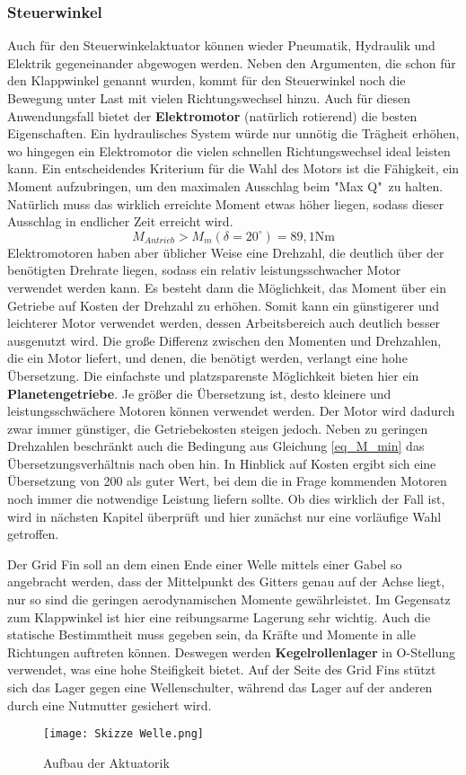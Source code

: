 \subsubsection{Steuerwinkel}
Auch für den Steuerwinkelaktuator können wieder Pneumatik, Hydraulik und Elektrik gegeneinander abgewogen werden. Neben den Argumenten, die schon für den Klappwinkel genannt wurden, kommt für den Steuerwinkel noch die Bewegung unter Last mit vielen Richtungswechsel hinzu. Auch für diesen Anwendungsfall bietet der \textbf{Elektromotor} (natürlich rotierend) die besten Eigenschaften. Ein hydraulisches System würde nur unnötig die Trägheit erhöhen, wo hingegen ein Elektromotor die vielen schnellen Richtungswechsel ideal leisten kann.
Ein entscheidendes Kriterium für die Wahl des Motors ist die Fähigkeit, ein Moment aufzubringen, um den maximalen Ausschlag beim "Max Q"\ zu halten. Natürlich muss das wirklich erreichte Moment etwas höher liegen, sodass dieser Ausschlag in endlicher Zeit erreicht wird.
\begin{equation}\label{eq_M_min}
	M_{Antrieb} > M_m(\delta = 20^\circ) = 89,1\mathrm{Nm}
\end{equation}
Elektromotoren haben aber üblicher Weise eine Drehzahl, die deutlich über der benötigten Drehrate liegen, sodass ein relativ leistungsschwacher Motor verwendet werden kann. Es besteht dann die Möglichkeit, das Moment über ein Getriebe auf Kosten der Drehzahl zu erhöhen. Somit kann ein günstigerer und leichterer Motor verwendet werden, dessen Arbeitsbereich auch deutlich besser ausgenutzt wird. Die große Differenz zwischen den Momenten und Drehzahlen, die ein Motor liefert, und denen, die benötigt werden, verlangt eine hohe Übersetzung. Die einfachste und platzsparenste Möglichkeit bieten hier ein \textbf{Planetengetriebe}. Je größer die Übersetzung ist, desto kleinere und leistungsschwächere Motoren können verwendet werden. Der Motor wird dadurch zwar immer günstiger, die Getriebekosten steigen jedoch. Neben zu geringen Drehzahlen beschränkt auch die Bedingung aus Gleichung \ref{eq_M_min} das Übersetzungsverhältnis nach oben hin. In Hinblick auf Kosten ergibt sich eine Übersetzung von 200 als guter Wert, bei dem die in Frage kommenden Motoren noch immer die notwendige Leistung liefern sollte. Ob dies wirklich der Fall ist, wird in nächsten Kapitel überprüft und hier zunächst nur eine vorläufige Wahl getroffen.

Der Grid Fin soll an dem einen Ende einer Welle mittels einer Gabel so angebracht werden, dass der Mittelpunkt des Gitters genau auf der Achse liegt, nur so sind die geringen aerodynamischen Momente gewährleistet. Im Gegensatz zum Klappwinkel ist hier eine reibungsarme Lagerung sehr wichtig. Auch die statische Bestimmtheit muss gegeben sein, da Kräfte und Momente in alle Richtungen auftreten können. Deswegen werden \textbf{Kegelrollenlager} in O-Stellung verwendet, was eine hohe Steifigkeit bietet. Auf der Seite des Grid Fins stützt sich das Lager gegen eine Wellenschulter, während das Lager auf der anderen durch eine Nutmutter gesichert wird.
\begin{figure}[h]
	\centering
	\texttt{[image: Skizze Welle.png]}
	\caption{Aufbau der Aktuatorik}
	\label{abb_Welle}
\end{figure}\\
